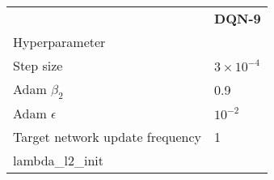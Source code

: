 \begin{tabular}{ll}
 & \bfseries DQN-9 \\
Hyperparameter &  \\
Step size & $3 \times 10^{-4}$ \\
Adam $\beta_2$ & 0.9 \\
Adam $\epsilon$ & $10^{-2}$ \\
Target network update frequency & 1 \\
lambda_l2_init &  \\
\end{tabular}
